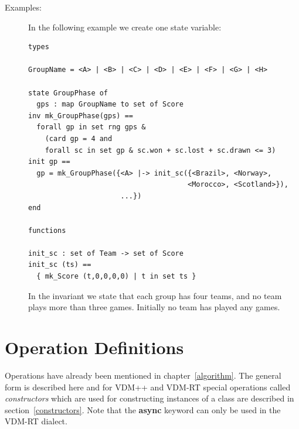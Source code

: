 \documentclass{overturerepchap}
\newcommand{\keyw}[1]{{\bf\ttfamily #1}}
\begin{document}
\begin{description}
\item[Examples:] In the following example we create one state variable:
  \begin{lstlisting}
types 

GroupName = <A> | <B> | <C> | <D> | <E> | <F> | <G> | <H>

state GroupPhase of
  gps : map GroupName to set of Score
inv mk_GroupPhase(gps) ==
  forall gp in set rng gps & 
    (card gp = 4 and
    forall sc in set gp & sc.won + sc.lost + sc.drawn <= 3)
init gp ==
  gp = mk_GroupPhase({<A> |-> init_sc({<Brazil>, <Norway>, 
                                      <Morocco>, <Scotland>}),
                      ...})
end

functions

init_sc : set of Team -> set of Score
init_sc (ts) ==
  { mk_Score (t,0,0,0,0) | t in set ts }
  \end{lstlisting}
  In the invariant we state that each group has four teams, and no team 
  plays more than three games. Initially no team has played any games.

\end{description}

\chapter{Operation Definitions} \label{op-def}

Operations have already been mentioned in chapter~\ref{algorithm}. The
general form is described here and for VDM++ and VDM-RT special
  operations called \emph{constructors} which are used for
  constructing instances of a class are described in
  section~\ref{constructors}. Note that the \keyw{async} keyword can
only be used in the VDM-RT dialect.
\end{document}
